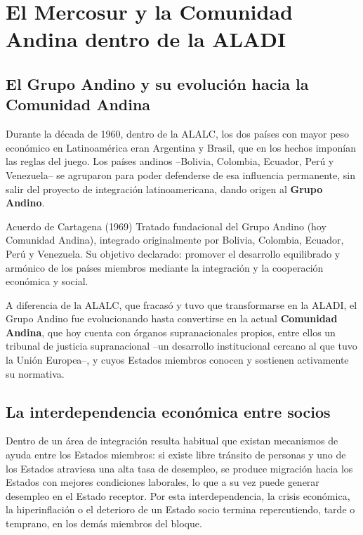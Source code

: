 \documentclass[12pt,oneside]{book}
\renewcommand{\chaptermark}[1]{\markboth{\thechapter.\ #1}{}}
\begin{document}
\chapter{El Mercosur y la Comunidad Andina dentro de la ALADI}
\chaptermark{Mercosur y Comunidad Andina}

\section{El Grupo Andino y su evolución hacia la Comunidad Andina}

Durante la década de 1960, dentro de la ALALC, los dos países con mayor peso económico en Latinoamérica eran Argentina y Brasil, que en los hechos imponían las reglas del juego. Los países andinos --Bolivia, Colombia, Ecuador, Perú y Venezuela-- se agruparon para poder defenderse de esa influencia permanente, sin salir del proyecto de integración latinoamericana, dando origen al \textbf{Grupo Andino}.

\begin{normacitada}{Acuerdo de Cartagena (1969)}
Tratado fundacional del Grupo Andino (hoy Comunidad Andina), integrado originalmente por Bolivia, Colombia, Ecuador, Perú y Venezuela. Su objetivo declarado: promover el desarrollo equilibrado y armónico de los países miembros mediante la integración y la cooperación económica y social.
\end{normacitada}

A diferencia de la ALALC, que fracasó y tuvo que transformarse en la ALADI, el Grupo Andino fue evolucionando hasta convertirse en la actual \textbf{Comunidad Andina}, que hoy cuenta con órganos supranacionales propios, entre ellos un tribunal de justicia supranacional --un desarrollo institucional cercano al que tuvo la Unión Europea--, y cuyos Estados miembros conocen y sostienen activamente su normativa.

\section{La interdependencia económica entre socios}

Dentro de un área de integración resulta habitual que existan mecanismos de ayuda entre los Estados miembros: si existe libre tránsito de personas y uno de los Estados atraviesa una alta tasa de desempleo, se produce migración hacia los Estados con mejores condiciones laborales, lo que a su vez puede generar desempleo en el Estado receptor. Por esta interdependencia, la crisis económica, la hiperinflación o el deterioro de un Estado socio termina repercutiendo, tarde o temprano, en los demás miembros del bloque.
\end{document}
